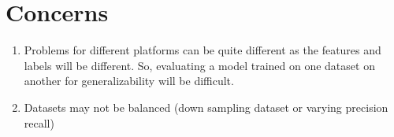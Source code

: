 \documentclass[11pt,letterpaper]{article}
\newcommand{\blue}[1]{\textcolor{RoyalBlue}{#1}}
\newcommand{\instructions}[1]{\blue{\textit{#1}}}
\renewcommand{\instructions}[1]{}
\begin{document}
\section*{Concerns}
\instructions{Let us know if you have any concerns, e.g. about the
  feasibility of your project, or the availability of a suitable
  training data}

 \begin{enumerate}
     \item Problems for different platforms can be quite different as the features and labels will be different. So, evaluating a model trained on one dataset on another for generalizability will be difficult.
    \item Datasets may not be balanced (down sampling  dataset or varying precision recall)
 \end{enumerate}

\section*{\instructions{Bibliography}}
\instructions{Do not  forget to include bibliographic references. You need to create your own .bib file. If you call it {\tt mybib.bib}
  and put it in the same directory as this {\tt .tex} file, add
  {\tt$\backslash$bibliography\{mybib\}} before
  {\tt$\backslash$end\{document\}}.
This template uses the natbib package, which allows you use a citation
format that includes author names and years (instead of numerical
references).  You can use the {\tt$\backslash$cite\{\}} command (
``\cite{Mins:69} presented a damaging critique of the perceptron'')
or {\tt$\backslash$citep\{\}} (``A damaging critique of the perceptron
\citep{Mins:69} had long-lasting effects on the development of AI'').
(NB: for a lot of papers on the ACL anthology, you can get the BibTeX
entry by changing the .pdf extension on the URL to  .bib,
e.g. from \url{http://aclweb.org/anthology/P/P17/P17-1001.pdf} to
\url{http://aclweb.org/anthology/P/P17/P17-1001.bib})
}


\nocite{*}
\end{document}
